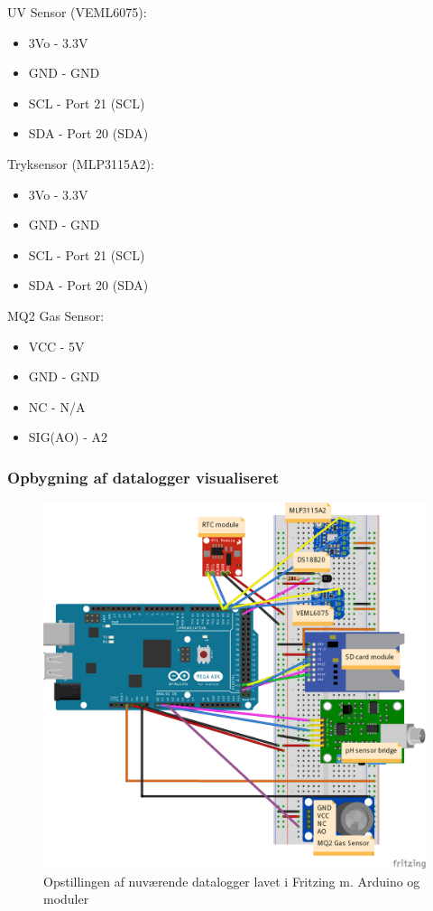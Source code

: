 		\newpage
		\begin{minipage}{0.49\textwidth}
			UV Sensor (VEML6075):
			\begin{itemize}
				\item 3Vo - 3.3V
				\item GND - GND
				\item SCL - Port 21 (SCL)
				\item SDA - Port 20 (SDA)
			\end{itemize}
			Tryksensor (MLP3115A2):
			\begin{itemize}
				\item 3Vo - 3.3V
				\item GND - GND
				\item SCL - Port 21 (SCL)
				\item SDA - Port 20 (SDA)
			\end{itemize}
		\end{minipage}
		\hfill
		\begin{minipage}{0.49\textwidth}
			MQ2 Gas Sensor:
			\begin{itemize}
				\item VCC - 5V
				\item GND - GND
				\item NC - N/A
				\item SIG(AO) - A2
			\end{itemize}
		\end{minipage}
		
	\newpage
	\subsubsection{Opbygning af datalogger visualiseret}\label{sec:VisuelDatalogger}
		\begin{figure}[h!]
			\centering
			\includegraphics[width=\textwidth]{Figures/Diagram_v3.png}
			\caption{Opstillingen af nuværende datalogger lavet i Fritzing m. Arduino og moduler} \label{fig:Opstilling}
		\end{figure}